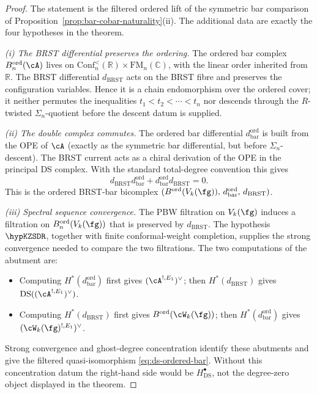 \begin{proof}
The statement is the filtered ordered lift of the symmetric bar
comparison of Proposition~\ref{prop:bar-cobar-naturality}(ii).  The
additional data are exactly the four hypotheses in the theorem.

\emph{(i) The BRST differential preserves the ordering.}
The ordered bar complex $B^{\mathrm{ord}}_n(\cA)$ lives on
$\mathrm{Conf}_n^{<}(\mathbb{R})
\times \mathrm{FM}_n(\mathbb{C})$, with the linear order
inherited from $\mathbb{R}$. The BRST differential
\(d_{\mathrm{BRST}}\) acts on the BRST fibre and preserves the
configuration variables.  Hence it is a chain endomorphism over the
ordered cover; it neither permutes the inequalities
\(t_1<t_2<\cdots<t_n\) nor descends through the \(R\)-twisted
\(\Sigma_n\)-quotient before the descent datum is supplied.

\emph{(ii) The double complex commutes.}
The ordered bar differential $d_{\mathrm{bar}}^{\mathrm{ord}}$
is built from the OPE of \(\cA\) (exactly as the symmetric bar
differential, but before \(\Sigma_n\)-descent). The BRST current acts
as a chiral derivation of the OPE in the principal DS complex. With the
standard total-degree convention this gives
\[
d_{\mathrm{BRST}}d_{\mathrm{bar}}^{\mathrm{ord}}
+d_{\mathrm{bar}}^{\mathrm{ord}}d_{\mathrm{BRST}}=0.
\]
This is the ordered BRST-bar bicomplex
$(B^{\mathrm{ord}}(V_k(\fg)),\,
d_{\mathrm{bar}}^{\mathrm{ord}},\,
d_{\mathrm{BRST}})$.

\emph{(iii) Spectral sequence convergence.}
The PBW filtration on $V_k(\fg)$ induces a filtration on
$B^{\mathrm{ord}}_n(V_k(\fg))$ that is preserved by
\(d_{\mathrm{BRST}}\).  The hypothesis \(\hypKZSDR\), together with
finite conformal-weight completion, supplies the strong convergence
needed to compare the two filtrations.  The two computations of the
abutment are:
\begin{itemize}
\item Computing $H^*(d_{\mathrm{bar}}^{\mathrm{ord}})$ first
 gives $(\cA^{!,E_1})^\vee$; then
 $H^*(d_{\mathrm{BRST}})$ gives
 $\mathrm{DS}((\cA^{!,E_1})^\vee)$.
\item Computing $H^*(d_{\mathrm{BRST}})$ first gives
 $B^{\mathrm{ord}}(\cW_k(\fg))$; then
 $H^*(d_{\mathrm{bar}}^{\mathrm{ord}})$ gives
 $(\cW_k(\fg)^{!,E_1})^\vee$.
\end{itemize}
Strong convergence and ghost-degree concentration identify these
abutments and give the filtered quasi-isomorphism
\eqref{eq:ds-ordered-bar}.  Without this concentration datum the
right-hand side would be \(H^\bullet_{\mathrm{DS}}\), not the
degree-zero object displayed in the theorem.


\end{proof}
